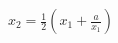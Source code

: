 \documentclass[preview]{standalone}
\begin{document}
\begin{align*}
x_2 = \frac{1}{2}(x_1 + \frac{a}{x_1})
\end{align*}
\end{document}
